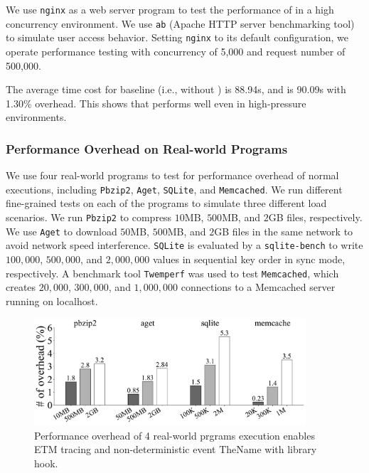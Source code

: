 We use \texttt{nginx} \cite{nginx_1.20.0} as a web server program to test the
performance of \TheName in a high concurrency environment. We use \texttt{ab}
(Apache HTTP server benchmarking tool) \cite{ApacheBench} to simulate user
access behavior. Setting \texttt{nginx} to its default configuration, we operate
performance testing with concurrency of 5,000 and request number of 500,000.

The average time cost for baseline (i.e., without \TheName) is 88.94s, and
\TheName is 90.09s with 1.30\% overhead. This shows that \TheName performs well
even in high-pressure environments.

\subsubsection{Performance Overhead on Real-world Programs} \label{subsec:eva-Performance-Normal}

We use four real-world programs to test \TheName for performance overhead of
normal executions, including \texttt{Pbzip2}, \texttt{Aget}, \texttt{SQLite},
and \texttt{Memcached}. We run different fine-grained tests on each of the
programs to simulate three different load scenarios. We run \texttt{Pbzip2} to
compress $10$MB, $500$MB, and $2$GB files, respectively. We use \texttt{Aget} to
download $50$MB, $500$MB, and $2$GB files in the same network to
avoid network speed interference. \texttt{SQLite} is evaluated by a
\texttt{sqlite-bench} \cite{sqlitebench} to write $100,000$, $500,000$, and
$2,000,000$ values in sequential key order in sync mode, respectively. A
benchmark tool \texttt{Twemperf} \cite{twemperf} was used to test
\texttt{Memcached}, which creates $20,000$, $300,000$, and $1,000,000$
connections to a Memcached server running on localhost.

\begin{figure}
    \centering
    \includegraphics[width=0.9\textwidth]{figures/normaloverheadbar.pdf}
    \caption{Performance overhead of 4 real-world prgrams execution enables ETM tracing and non-deterministic event TheName with library hook.}
    \label{fig:Performance overhead of Normal Execution}
\end{figure}


